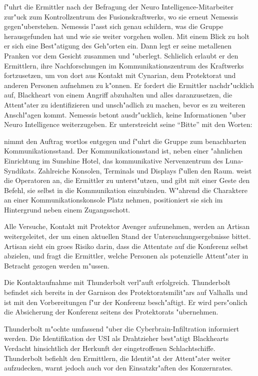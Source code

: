 \xl{} f"uhrt die Ermittler nach der Befragung der Neuro Intelligence-Mitarbeiter zur"uck zum Kontrollzentrum des Fusionskraftwerks, wo sie erneut Nemessis gegen"uberstehen. Nemessis l"asst sich genau schildern, was die Gruppe herausgefunden hat und wie sie weiter vorgehen wollen. Mit einem Blick zu \xl{} holt er sich eine Best"atigung des Geh"orten ein. Dann legt er seine metallenen Pranken vor dem Gesicht zusammen und "uberlegt. Schlie\3lich erlaubt er den Ermittlern, ihre Nachforschungen im Kommunikationszentrum des Kraftwerks fortzusetzen, um von dort aus Kontakt mit Cynarian, dem Protektorat und anderen Personen aufnehmen zu k"onnen. Er fordert die Ermittler nachdr"ucklich auf, Blackheart von einem Angriff abzuhalten und alles daranzusetzen, die Attent"ater zu identifizieren und unsch"adlich zu machen, bevor es zu weiteren Anschl"agen kommt. Nemessis betont ausdr"ucklich, keine Informationen "uber Neuro Intelligence weiterzugeben. Er unterstreicht seine ``Bitte'' mit den Worten:


\xl{} nimmt den Auftrag wortlos entgegen und f"uhrt die Gruppe zum benachbarten Kommunikationsstand. Der Kommunikationsstand ist, neben einer "ahnlichen Einrichtung im Sunshine Hotel, das kommunikative Nervenzentrum des Luna-Syndikats. Zahlreiche Konsolen, Terminals und Displays f"ullen den Raum. \xl{} weist die Operatoren an, die Ermittler zu unterst"utzen, und gibt mit einer Geste den Befehl, sie selbst in die Kommunikation einzubinden. W"ahrend die Charaktere an einer Kommunikationskonsole Platz nehmen, positioniert sie sich im Hintergrund neben einem Zugangsschott.

Alle Versuche, Kontakt mit Protektor Avenger aufzunehmen, werden an Artisan weitergeleitet, der um einen aktuellen Stand der Untersuchungsergebnisse bittet. Artisan sieht ein gro\3es Risiko darin, dass die Attentate auf die Konferenz selbst abzielen, und fragt die Ermittler, welche Personen als potenzielle Attent"ater in Betracht gezogen werden m"ussen.

Die Kontaktaufnahme mit Thunderbolt verl"auft erfolgreich. Thunderbolt befindet sich bereits in der Garnison des Protektoratsmilit"ars auf Valhalla und ist mit den Vorbereitungen f"ur der Konferenz besch"aftigt. Er wird pers"onlich die Absicherung der Konferenz seitens des Protektorats "ubernehmen. 

Thunderbolt m"ochte umfassend "uber die Cyberbrain-Infiltration informiert werden. Die Identifikation der USI als Drahtzieher best"atigt Blackhearts Verdacht hinsichtlich der Herkunft der eingetroffenen Schlachtschiffe. Thunderbolt befiehlt den Ermittlern, die Identit"at der Attent"ater weiter aufzudecken, warnt jedoch auch vor den Einsatzkr"aften des Konzernrates. 

